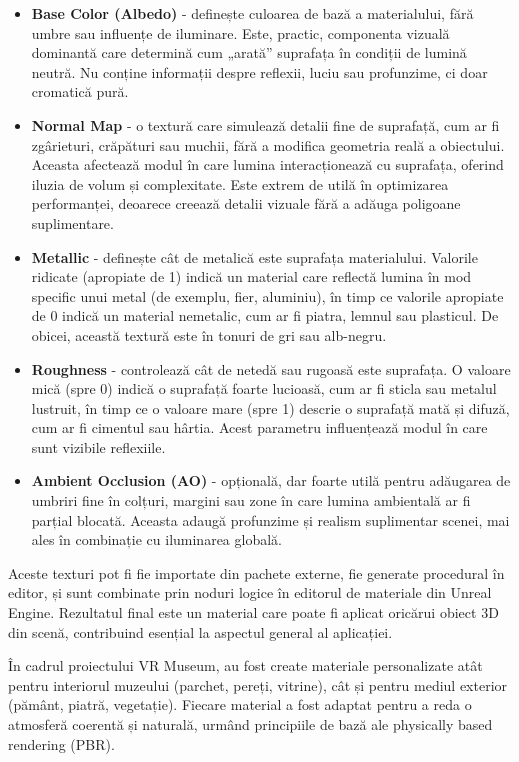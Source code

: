 \begin{itemize}
\item \textbf{Base Color (Albedo)} - definește culoarea de bază a materialului, fără umbre sau influențe de iluminare. Este, practic, componenta vizuală dominantă care determină cum „arată” suprafața în condiții de lumină neutră. Nu conține informații despre reflexii, luciu sau profunzime, ci doar cromatică pură.
\item \textbf{Normal Map} - o textură care simulează detalii fine de suprafață, cum ar fi zgârieturi, crăpături sau muchii, fără a modifica geometria reală a obiectului. Aceasta afectează modul în care lumina interacționează cu suprafața, oferind iluzia de volum și complexitate. Este extrem de utilă în optimizarea performanței, deoarece creează detalii vizuale fără a adăuga poligoane suplimentare.
\item \textbf{Metallic} - definește cât de metalică este suprafața materialului. Valorile ridicate (apropiate de 1) indică un material care reflectă lumina în mod specific unui metal (de exemplu, fier, aluminiu), în timp ce valorile apropiate de 0 indică un material nemetalic, cum ar fi piatra, lemnul sau plasticul. De obicei, această textură este în tonuri de gri sau alb-negru.
\item \textbf{Roughness} - controlează cât de netedă sau rugoasă este suprafața. O valoare mică (spre 0) indică o suprafață foarte lucioasă, cum ar fi sticla sau metalul lustruit, în timp ce o valoare mare (spre 1) descrie o suprafață mată și difuză, cum ar fi cimentul sau hârtia. Acest parametru influențează modul în care sunt vizibile reflexiile.
\item \textbf{Ambient Occlusion (AO)} - opțională, dar foarte utilă pentru adăugarea de umbriri fine în colțuri, margini sau zone în care lumina ambientală ar fi parțial blocată. Aceasta adaugă profunzime și realism suplimentar scenei, mai ales în combinație cu iluminarea globală.
\end{itemize}

Aceste texturi\cite{textures:texturesdotcom} pot fi fie importate din pachete externe, fie generate procedural în editor, și sunt combinate prin noduri logice în editorul de materiale din Unreal Engine. Rezultatul final este un material care poate fi aplicat oricărui obiect 3D din scenă, contribuind esențial la aspectul general al aplicației.

În cadrul proiectului VR Museum, au fost create materiale personalizate atât pentru interiorul muzeului (parchet, pereți, vitrine), cât și pentru mediul exterior (pământ, piatră, vegetație)\cite{textures:polyigon}. Fiecare material a fost adaptat pentru a reda o atmosferă coerentă și naturală, urmând principiile de bază ale physically based rendering (PBR)\cite{textures:ambientcg}.

